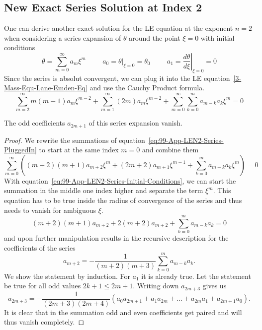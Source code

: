 \subsection{New Exact \texorpdfstring{}{LE} Series Solution at Index 2}
\label{subsec:99-app-new-exact-le-sol-n2}
One can derive another exact solution for the \ac{LE} equation at the exponent $n=2$ when
considering a series expansion of $\theta$ around the point $\xi=0$ with initial conditions
\begin{equation}
	\theta=\sum\limits_{m=0}^\infty a_m\xi^m \hspace{1cm} a_0=\left.\theta\right|_{\xi=0}=\theta_0
	\hspace{1cm} a_1=\left.\frac{d\theta}{d\xi}\right|_{\xi=0}=0
	\label{eq:99-App-LEN2-Series-Initial-Conditions}
\end{equation}
Since the series is absolut convergent, we can plug it into the \ac{LE} equation~\ref{3-Mass-Equ-Lane-Emden-Eq} and use the Cauchy Product formula.
\begin{equation}
	\sum\limits_{m=2}^\infty m(m-1)a_m\xi^{m-2}+\sum\limits_{m=1}^\infty (2m)a_m\xi^{m-2} +
	\sum\limits_{m=0}^\infty\sum\limits_{k=0}^m a_{m-k}a_k\xi^m = 0
	\label{eq:99-App-LEN2-Series-PluggedIn}
\end{equation}
\begin{theorem}
	The odd coefficients $a_{2m+1}$ of this series expansion vanish.
\end{theorem}
\begin{proof}
	We rewrite the summations of equation~\ref{eq:99-App-LEN2-Series-PluggedIn} to start at the
	same index $m=0$ and combine them
	\begin{equation}
		\sum\limits_{m=0}^\infty\left((m+2)(m+1)a_{m+2}\xi^{m}+(2m+2)a_{m+1}\xi^{m-1} + \sum\limits_{k=0}^m a_{m-k}a_k\xi^m\right) = 0
		\label{eq:99-App-LE-New-Recursive-1}
	\end{equation}
	With equation~\ref{eq:99-App-LEN2-Series-Initial-Conditions}, we can start the summation
	in the middle one index higher and separate the term $\xi^m$.
	This equation has to be true
	inside the radius of convergence of the series and thus needs to vanish for ambiguous $\xi$.
	\begin{equation}
		(m+2)(m+1)a_{m+2}+2(m+2)a_{m+2}+\sum\limits_{k=0}^m a_{m-k}a_k = 0
		\label{eq:99-App-LE-New-Recursive-2}
	\end{equation}
	and upon further manipulation results in the recursive description for the coefficients
	of the series
	\begin{equation}
		a_{m+2} = -\frac{1}{(m+2)(m+3)}\sum\limits_{k=0}^m a_{m-k}a_k.
		\label{eq:99-App-LEN2-Recursive-Coefficients}
	\end{equation}
	We show the statement by induction.
	For $a_1$ it is already true.
	Let the statement be true for all odd values $2k+1\leq2m+1$.
	Writing down $a_{2m+3}$ gives us
	\begin{equation}
		a_{2m+3} = -\frac{1}{(2m+3)(2m+4)}\left(a_0 a_{2m+1}+a_1 a_{2m}+\dots+a_{2m}a_1+a_{2m+1}a_0\right).
		\label{eq:99-App-LE-New-Recursive-3}
	\end{equation}
	It is clear that in the summation odd and even coefficients get paired and will thus
	vanish completely.
\end{proof}
